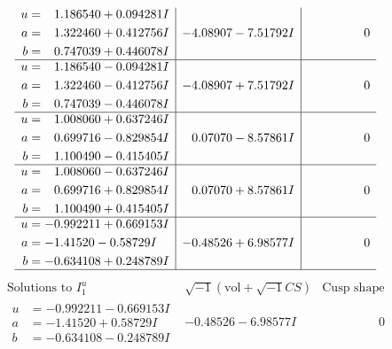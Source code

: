 \documentclass[1p]{elsarticle_modified}
\theoremstyle{definition}
\newcommand{\I}{\sqrt{-1}}
\begin{document}
$$\begin{array}{c|c|c}
\begin{aligned}
u &= \phantom{-}1.186540 + 0.094281 I \\
a &= \phantom{-}1.322460 + 0.412756 I \\
b &= \phantom{-}0.747039 + 0.446078 I\end{aligned}
 & -4.08907 - 7.51792 I & \phantom{-0.000000 } 0 \\ \hline\begin{aligned}
u &= \phantom{-}1.186540 - 0.094281 I \\
a &= \phantom{-}1.322460 - 0.412756 I \\
b &= \phantom{-}0.747039 - 0.446078 I\end{aligned}
 & -4.08907 + 7.51792 I & \phantom{-0.000000 } 0 \\ \hline\begin{aligned}
u &= \phantom{-}1.008060 + 0.637246 I \\
a &= \phantom{-}0.699716 - 0.829854 I \\
b &= \phantom{-}1.100490 - 0.415405 I\end{aligned}
 & \phantom{-}0.07070 - 8.57861 I & \phantom{-0.000000 } 0 \\ \hline\begin{aligned}
u &= \phantom{-}1.008060 - 0.637246 I \\
a &= \phantom{-}0.699716 + 0.829854 I \\
b &= \phantom{-}1.100490 + 0.415405 I\end{aligned}
 & \phantom{-}0.07070 + 8.57861 I & \phantom{-0.000000 } 0 \\ \hline\begin{aligned}
u &= -0.992211 + 0.669153 I \\
a &= -1.41520 - 0.58729 I \\
b &= -0.634108 + 0.248789 I\end{aligned}
 & -0.48526 + 6.98577 I & \phantom{-0.000000 } 0\\
 \hline 
 \end{array}$$\newpage$$\begin{array}{c|c|c}  
\text{Solutions to }I^u_{1}& \I (\text{vol} + \sqrt{-1}CS) & \text{Cusp shape}\\
 \hline 
\begin{aligned}
u &= -0.992211 - 0.669153 I \\
a &= -1.41520 + 0.58729 I \\
b &= -0.634108 - 0.248789 I\end{aligned}
 & -0.48526 - 6.98577 I & \phantom{-0.000000 } 0 \\ \hline\begin{aligned}

\end{aligned}
\end{array}$$
\end{document}
